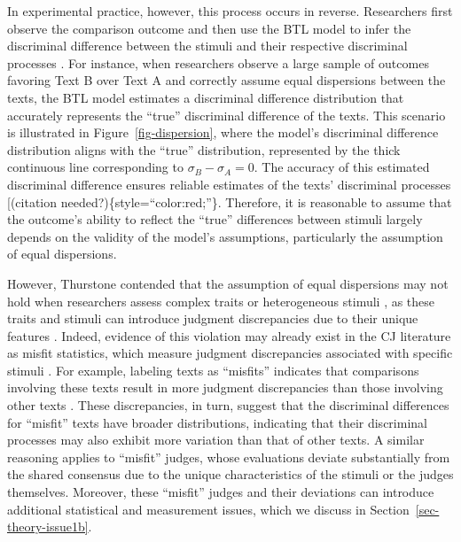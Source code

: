 \documentclass[
  authoryear,
  preprint,
  1p]{elsarticle}
\begin{document}
In experimental practice, however, this process occurs in reverse.
Researchers first observe the comparison outcome and then use the BTL
model to infer the discriminal difference between the stimuli and their
respective discriminal processes \citep[pp.~373]{Thurstone_1927a}. For
instance, when researchers observe a large sample of outcomes favoring
Text B over Text A and correctly assume equal dispersions between the
texts, the BTL model estimates a discriminal difference distribution
that accurately represents the ``true'' discriminal difference of the
texts. This scenario is illustrated in Figure~\ref{fig-dispersion},
where the model's discriminal difference distribution aligns with the
``true'' distribution, represented by the thick continuous line
corresponding to \(\sigma_{B}-\sigma_{A}=0\). The accuracy of this
estimated discriminal difference ensures reliable estimates of the
texts' discriminal processes {[}(citation
needed?)\{style=``color:red;''\}. Therefore, it is reasonable to assume
that the outcome's ability to reflect the ``true'' differences between
stimuli largely depends on the validity of the model's assumptions,
particularly the assumption of equal dispersions.

However, Thurstone contended that the assumption of equal dispersions
may not hold when researchers assess complex traits or heterogeneous
stimuli \citep[pp.~376]{Thurstone_1927a}, as these traits and stimuli
can introduce judgment discrepancies due to their unique features
\citep{vanDaal_et_al_2016, Lesterhuis_2018, Chambers_et_al_2022}.
Indeed, evidence of this violation may already exist in the CJ
literature as misfit statistics, which measure judgment discrepancies
associated with specific stimuli
\citetext{\citealp[pp.~12]{Pollitt_2004}; \citealp[pp.~20]{Goossens_et_al_2018}}.
For example, labeling texts as ``misfits'' indicates that comparisons
involving these texts result in more judgment discrepancies than those
involving other texts
\citep{Pollitt_2012a, Pollitt_2012b, vanDaal_et_al_2016, Goossens_et_al_2018}.
These discrepancies, in turn, suggest that the discriminal differences
for ``misfit'' texts have broader distributions, indicating that their
discriminal processes may also exhibit more variation than that of other
texts. A similar reasoning applies to ``misfit'' judges, whose
evaluations deviate substantially from the shared consensus due to the
unique characteristics of the stimuli or the judges themselves.
Moreover, these ``misfit'' judges and their deviations can introduce
additional statistical and measurement issues, which we discuss in
Section~\ref{sec-theory-issue1b}.
\end{document}
